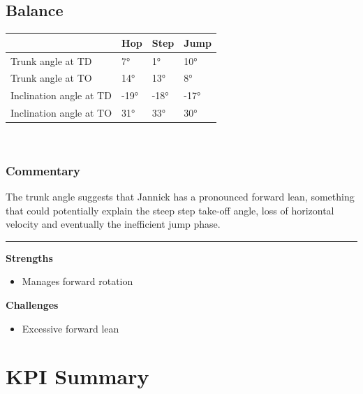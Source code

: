 \documentclass[]{scrreprt}
\providecommand{\tightlist}{%
  \setlength{\itemsep}{0pt}\setlength{\parskip}{0pt}}
\begin{document}
\clearpage

\hypertarget{balance-1}{%
\section{Balance}\label{balance-1}}

\begin{table}[H]
\centering
\begin{tabular}{l|l|l|l}
\hline
  & Hop & Step & Jump\\
\hline
Trunk angle at TD & 7° & 1° & 10°\\
\hline
Trunk angle at TO & 14° & 13° & 8°\\
\hline
Inclination angle at TD & -19° & -18° & -17°\\
\hline
Inclination angle at TO & 31° & 33° & 30°\\
\hline
\end{tabular}
\end{table}

~

\hypertarget{commentary-4}{%
\subsection{Commentary}\label{commentary-4}}

The trunk angle suggests that Jannick has a pronounced forward lean, something that could potentially explain the steep step take-off angle, loss of horizontal velocity and eventually the inefficient jump phase.

\begin{center}\rule{0.5\linewidth}{0.5pt}\end{center}

\textbf{Strengths}

\begin{itemize}
\tightlist
\item
  Manages forward rotation
\end{itemize}

\textbf{Challenges}

\begin{itemize}
\tightlist
\item
  Excessive forward lean
\end{itemize}

\clearpage

\hypertarget{kpi-summary}{%
\chapter{KPI Summary}\label{kpi-summary}}
\end{document}

